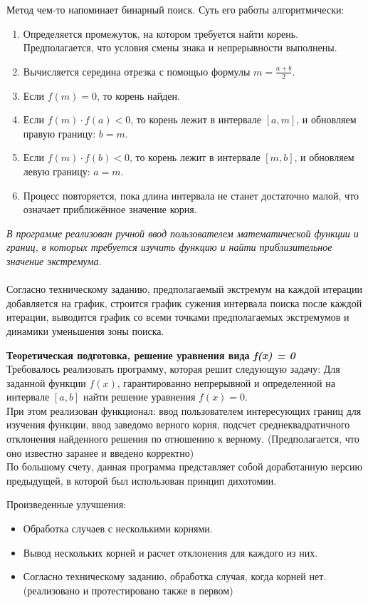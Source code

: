 Метод чем-то напоминает бинарный поиск. Суть его работы алгоритмически:
\begin{enumerate}
    \item Определяется промежуток, на котором требуется найти корень. Предполагается, что условия смены знака и непрерывности выполнены.
    \item Вычисляется середина отрезка с помощью формулы \( m = \frac{a + b}{2} \). 
    \item Если \( f(m) = 0 \), то корень найден. 
    \item Если \( f(m) \cdot f(a) < 0 \), то корень лежит в интервале \([a, m]\), и обновляем правую границу: \(b = m\).
    \item Если \( f(m) \cdot f(b) < 0 \), то корень лежит в интервале \([m, b]\), и обновляем левую границу: \(a = m\).
    \item Процесс повторяется, пока длина интервала не станет достаточно малой, что означает приближённое значение корня.
\end{enumerate}
\textit{В программе реализован ручной ввод пользователем математической функции и границ, в которых требуется изучить функцию и найти приблизительное значение экстремума.} \\
\\
Согласно техническому заданию, предполагаемый экстремум на каждой итерации добавляется на график,
строится график сужения интервала поиска после каждой итерации, выводится график со всеми точками
предполагаемых экстремумов и динамики уменьшения зоны поиска.
\vspace{1cm}

\textbf{Теоретическая подготовка, решение уравнения вида \textit{f(x) = 0}}\\ 
Требовалось реализовать программу, которая решит следующую задачу:
Для заданной функции $f(x)$, гарантированно непрерывной и определенной на интервале
$[a,b]$ найти решение уравнения $f(x) = 0$.\\
При этом реализован функционал:
ввод пользователем интересующих границ для изучения функции, ввод заведомо верного корня,
подсчет среднеквадратичного отклонения найденного решения по отношению к верному. (Предполагается,
что оно известно заранее и введено корректно)
\\

По большому счету, данная программа представляет собой доработанную версию предыдущей, в
которой был использован принцип дихотомии.

Произведенные улучшения:
\begin{itemize}
    \item Обработка случаев с несколькими корнями.
    \item Вывод нескольких корней и расчет отклонения для каждого из них.
    \item Согласно техническому заданию, обработка случая, когда корней нет. (реализовано и протестировано также в первом)
\end{itemize}

